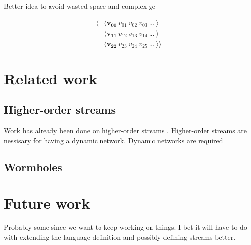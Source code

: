 \documentclass[twocolumn,11pt,english]{article}
\begin{document}
Better idea to avoid wasted space and complex ge


\begin{align*}
  \langle &\langle \mathbf{v_{00}} ~ v_{01} ~ v_{02} ~ v_{03} ~ ... ~ \rangle \\
  &\langle  \mathbf{v_{11}} ~ v_{12} ~ v_{13} ~ v_{14} ~ ... ~ \rangle \\
  &\langle  \mathbf{v_{22}} ~ v_{23} ~ v_{24} ~ v_{25} ~ ...  ~ \rangle \rangle
\end{align*}

\section{Related work}

\subsection{Higher-order streams}
Work has already been done on higher-order streams \cite{HighOrderStreams}. Higher-order streams are nessisary for having a dynamic network. Dynamic networks are required

\subsection{Wormholes}
\cite{WinogradCort2012HS}
\section{Future work}
Probably some since we want to keep working on things. I bet it will have to do with extending the language definition and possibly defining streams better.




\end{document}
